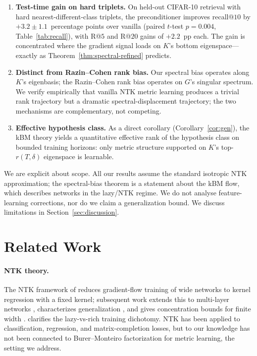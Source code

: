 \documentclass[11pt,letterpaper]{article}
\begin{document}
\begin{enumerate}
\item \textbf{Test-time gain on hard triplets.} On held-out CIFAR-10
retrieval with hard nearest-different-class triplets, the preconditioner
improves recall@$10$ by $+3.2 \pm 1.1$~percentage points over vanilla
(paired $t$-test $p = 0.004$, Table~\ref{tab:recall}), with R@$5$ and R@$20$
gains of $+2.2$~pp each. The gain is concentrated where the gradient signal
loads on $K$'s bottom eigenspace---exactly as
Theorem~\ref{thm:spectral-refined} predicts.

\item \textbf{Distinct from Razin--Cohen rank bias.} Our spectral bias
operates along $K$'s eigenbasis; the Razin--Cohen rank bias operates
on $G$'s singular spectrum. We verify empirically that vanilla NTK
metric learning produces a trivial rank trajectory but a dramatic
spectral-displacement trajectory; the two mechanisms are complementary,
not competing.

\item \textbf{Effective hypothesis class.} As a direct corollary
(Corollary~\ref{cor:gen}), the kBM theory yields a quantitative effective
rank of the hypothesis class on bounded training horizons: only metric
structure supported on $K$'s top-$r(T, \delta)$ eigenspace is learnable.
\end{enumerate}

We are explicit about scope. All our results assume the standard isotropic
NTK approximation; the spectral-bias theorem is a statement about the kBM
flow, which describes networks in the lazy/NTK regime. We do not analyse
feature-learning corrections, nor do we claim a generalization bound. We
discuss limitations in Section~\ref{sec:discussion}.

\section{Related Work}
\label{sec:related}

\paragraph{NTK theory.}
The NTK framework of \citet{jacot2018neural} reduces gradient-flow training
of wide networks to kernel regression with a fixed kernel; subsequent work
extends this to multi-layer networks \citep{lee2019wide,arora2019fine},
characterizes generalization \citep{arora2019fine}, and gives concentration
bounds for finite width \citep{du2019gradient}. \citet{chizat2020implicit}
clarifies the lazy-vs-rich training dichotomy. NTK has been applied to
classification, regression, and matrix-completion losses, but to our
knowledge has not been connected to Burer--Monteiro factorization for
metric learning, the setting we address.
\end{document}
